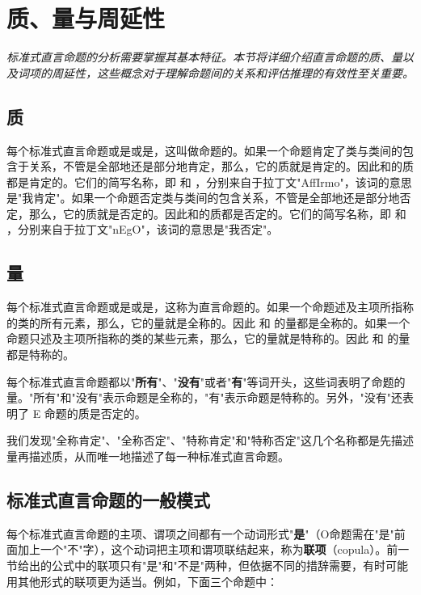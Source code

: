 \section{质、量与周延性}

\begin{logicbox}[title=引言]
\textit{标准式直言命题的分析需要掌握其基本特征。本节将详细介绍直言命题的质、量以及词项的周延性，这些概念对于理解命题间的关系和评估推理的有效性至关重要。}
\end{logicbox}

\subsection{质}
每个标准式直言命题或是或是，这叫做命题的。如果一个命题肯定了类与类间的包含于关系，不管是全部地还是部分地肯定，那么，它的质就是肯定的。因此和的质都是肯定的。它们的简写名称，即  和 ，分别来自于拉丁文"AffIrmo"，该词的意思是"我肯定"。如果一个命题否定类与类间的包含关系，不管是全部地还是部分地否定，那么，它的质就是否定的。因此和的质都是否定的。它们的简写名称，即  和 ，分别来自于拉丁文"nEgO"，该词的意思是"我否定"。

\subsection{量}
每个标准式直言命题或是或是，这称为直言命题的。如果一个命题述及主项所指称的类的所有元素，那么，它的量就是全称的。因此 和 的量都是全称的。如果一个命题只述及主项所指称的类的某些元素，那么，它的量就是特称的。因此 和 的量都是特称的。

每个标准式直言命题都以"\textbf{所有}"、"\textbf{没有}"或者"\textbf{有}"等词开头，这些词表明了命题的量。"所有"和"没有"表示命题是全称的，"有"表示命题是特称的。另外，"没有"还表明了 E 命题的质是否定的。

我们发现"全称肯定"、"全称否定"、"特称肯定"和"特称否定"这几个名称都是先描述量再描述质，从而唯一地描述了每一种标准式直言命题。

\subsection{标准式直言命题的一般模式}
每个标准式直言命题的主项、谓项之间都有一个动词形式"\textbf{是}"（O命题需在"是"前面加上一个"不"字），这个动词把主项和谓项联结起来，称为\textbf{联项}（copula）。前一节给出的公式中的联项只有"是"和"不是"两种，但依据不同的措辞需要，有时可能用其他形式的联项更为适当。例如，下面三个命题中：

